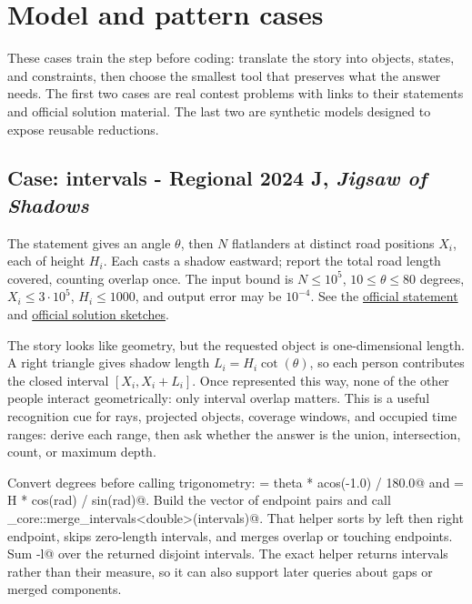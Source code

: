 \section{Model and pattern cases}

These cases train the step before coding: translate the story into objects,
states, and constraints, then choose the smallest tool that preserves what
the answer needs. The first two cases are real contest problems with links to
their statements and official solution material. The last two are synthetic
models designed to expose reusable reductions.

\subsection{Case: intervals - Regional 2024 J, \emph{Jigsaw of Shadows}}
\label{case:intervals}

The statement gives an angle $\theta$, then $N$ flatlanders at distinct road
positions $X_i$, each of height $H_i$. Each casts a shadow eastward; report
the total road length covered, counting overlap once. The input bound is
$N\le 10^5$, $10\le\theta\le80$ degrees, $X_i\le3\cdot10^5$,
$H_i\le1000$, and output error may be $10^{-4}$. See the
\href{https://codeforces.com/gym/105505/attachments/download/28244/contest_onesided.pdf}{official
statement} and \href{https://codeforces.com/gym/105505/attachments/download/28286/icpcla24_solution_sketches.pdf}{official
solution sketches}.

The story looks like geometry, but the requested object is one-dimensional
length. A right triangle gives shadow length $L_i=H_i\cot(\theta)$, so each
person contributes the closed interval $[X_i,X_i+L_i]$. Once represented this
way, none of the other people interact geometrically: only interval overlap
matters. This is a useful recognition cue for rays, projected objects,
coverage windows, and occupied time ranges: derive each range, then ask
whether the answer is the union, intersection, count, or maximum depth.

Convert degrees before calling trigonometry:
\verb@rad = theta * acos(-1.0) / 180.0@ and
\verb@L = H * cos(rad) / sin(rad)@. Build the vector of endpoint pairs and
call \verb@finals_core::merge_intervals<double>(intervals)@. That helper
sorts by left then right endpoint, skips zero-length intervals, and merges
overlap or touching endpoints. Sum \verb@r-l@ over the returned disjoint
intervals. The exact helper returns intervals rather than their measure, so
it can also support later queries about gaps or merged components.

